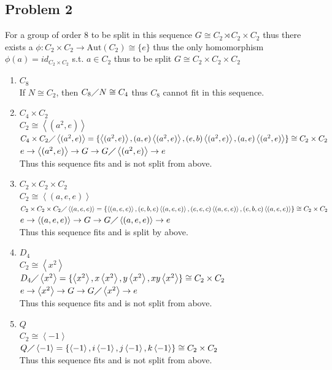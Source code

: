 \documentclass[12pt, letterpaper]{article}
\theoremstyle{definition}
\renewcommand{\t}[1]{\text{#1}}
\newcommand{\ang}[1]{\left\langle #1 \right\rangle}
\begin{document}
\subsection*{Problem 2}
For a group of order $8$ to be split in this sequence $G \cong C_2 \rtimes C_2 \times C_2$ thus there exists a $\phi: C_2 \times C_2 \rightarrow \t{Aut}(C_2)\cong\{e\}$
thus the only homomorphism $\phi(a)=id_{C_2\times C_2}$ s.t. $a \in C_2$ thus to be split $G \cong C_2 \times C_2 \times C_2$
\begin{enumerate}
    \item $C_8$\\
    If $N \cong C_2$, then $C_8 \diagup N \cong C_4$ thus $C_8$ cannot fit in this sequence.
    \item $C_4 \times C_2$\\
    $C_2 \cong \ang{(a^2,e)}$\\
    $C_4\times C_2 \diagup \ang{(a^2,e)} = \{\ang{(a^2,e)}, (a,e)\ang{(a^2,e)}, (e,b)\ang{(a^2,e)}, (a,e)\ang{(a^2,e)}\} \cong C_2 \times C_2$\\
    $e \rightarrow \ang{(a^2,e)} \rightarrow G \rightarrow G\diagup\ang{(a^2,e)} \rightarrow e$\\
    Thus this sequence fits and is not split from above.
    \item $C_2\times C_2 \times C_2$\\
    $C_2 \cong \ang{(a,e,e)}$\\
    $C_2\times C_2 \times C_2 \diagup \ang{(a,e,e)} = \{\ang{(a,e,e)}, (e,b,e)\ang{(a,e,e)}, (e,e,c)\ang{(a,e,e)}, (e,b,c)\ang{(a,e,e)}\} \cong C_2 \times C_2$\\
    $e \rightarrow \ang{(a,e,e)} \rightarrow G \rightarrow G\diagup\ang{(a,e,e)} \rightarrow e$\\
    Thus this sequence fits and is split by above.
    \item $D_4$\\
    $C_2 \cong \ang{x^2}$\\
    $D_4 \diagup \ang{x^2} = \{\ang{x^2}, x\ang{x^2}, y\ang{x^2}, xy\ang{x^2}\} \cong C_2 \times C_2$\\
    $e \rightarrow \ang{x^2} \rightarrow G \rightarrow G\diagup\ang{x^2} \rightarrow e$\\
    Thus this sequence fits and is not split from above.
    \item $Q$\\
    $C_2 \cong \ang{-1}$\\
    $Q \diagup \ang{-1} = \{\ang{-1}, i\ang{-1}, j\ang{-1}, k\ang{-1}\} \cong C_2 \times C_2$\\
    Thus this sequence fits and is not split from above.
\end{enumerate}
\end{document}
